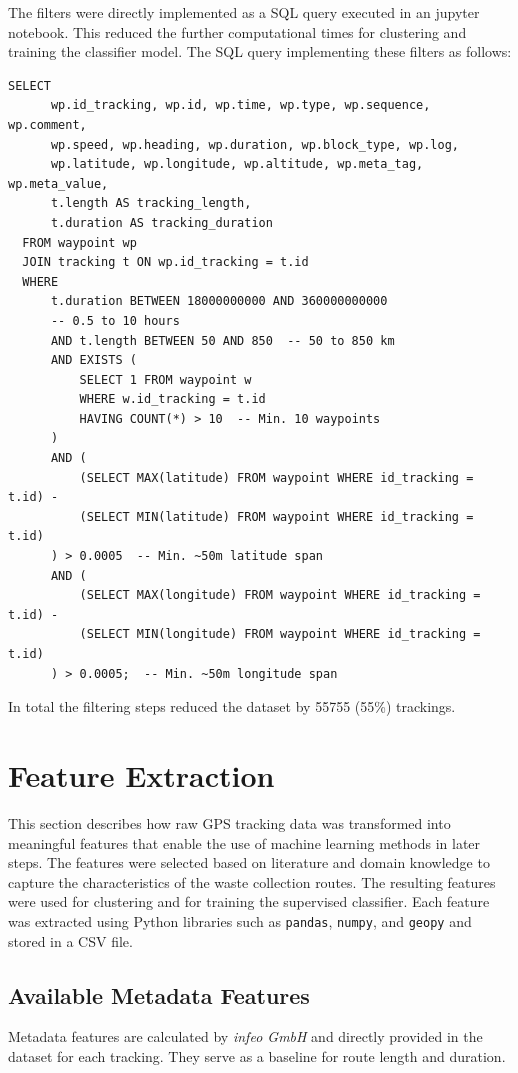 \documentclass[a4paper,12pt,twoside]{scrreprt}
\begin{document}
The filters were directly implemented as a SQL query executed in an jupyter
notebook. This reduced the further computational times for clustering and
training the classifier model. The SQL query implementing these filters
as follows:
\begin{lstlisting}[style=sql,caption={SQL query used for filtering the GPS tracking dataset},label={lst:sql-filter}]
  SELECT
      wp.id_tracking, wp.id, wp.time, wp.type, wp.sequence, wp.comment,
      wp.speed, wp.heading, wp.duration, wp.block_type, wp.log,
      wp.latitude, wp.longitude, wp.altitude, wp.meta_tag, wp.meta_value,
      t.length AS tracking_length,
      t.duration AS tracking_duration
  FROM waypoint wp
  JOIN tracking t ON wp.id_tracking = t.id
  WHERE
      t.duration BETWEEN 18000000000 AND 360000000000
      -- 0.5 to 10 hours
      AND t.length BETWEEN 50 AND 850  -- 50 to 850 km
      AND EXISTS (
          SELECT 1 FROM waypoint w
          WHERE w.id_tracking = t.id
          HAVING COUNT(*) > 10  -- Min. 10 waypoints
      )
      AND (
          (SELECT MAX(latitude) FROM waypoint WHERE id_tracking = t.id) -
          (SELECT MIN(latitude) FROM waypoint WHERE id_tracking = t.id)
      ) > 0.0005  -- Min. ~50m latitude span
      AND (
          (SELECT MAX(longitude) FROM waypoint WHERE id_tracking = t.id) -
          (SELECT MIN(longitude) FROM waypoint WHERE id_tracking = t.id)
      ) > 0.0005;  -- Min. ~50m longitude span
  \end{lstlisting}

In total the filtering steps reduced the dataset by 55755 (55\%) trackings.

\section{Feature Extraction}
This section describes how raw GPS tracking data was transformed into
meaningful features that enable the use of machine learning methods in later
steps.
The features were selected based on literature and domain knowledge to capture
the characteristics of the waste collection routes.
The resulting features were used for clustering and for training the supervised
classifier. Each feature was extracted using Python libraries such as
\texttt{pandas}, \texttt{numpy}, and \texttt{geopy} and stored in a CSV file.

\subsection{Available Metadata Features}
Metadata features are calculated by \textit{infeo GmbH} and directly provided
in the dataset for each tracking. They
serve as a
baseline for route length and duration.
\end{document}
